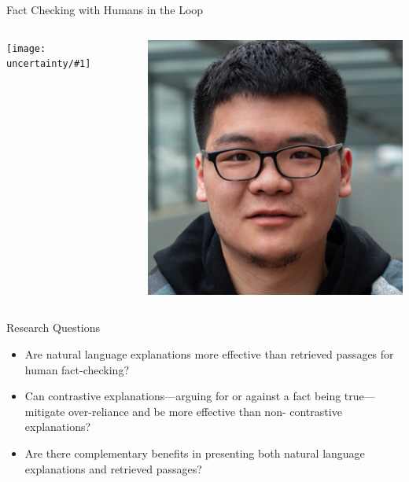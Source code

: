 \documentclass[compress]{beamer}
\newcommand{\gfxu}[2]{
	\begin{center}
		\texttt{[image: uncertainty/\#1]}
	\end{center}
}
\begin{document}
\begin{frame}{Fact Checking with Humans in the Loop}
	\begin{columns}

\gfxu{paper_convincingly}{.9}

\begin{center}
\includegraphics[width=1.0\linewidth]{general_figures/chenglei}		
	
\end{center}
	\end{columns}
\end{frame}

\begin{frame}{Research Questions}
	\begin{itemize}
		\item Are natural language explanations more effective than retrieved passages for human fact-checking?
		\item Can contrastive explanations—arguing for or against a fact being true—mitigate over-reliance and be more effective than non- contrastive explanations?
		\item  Are there complementary benefits in presenting both natural language explanations and retrieved passages?
	\end{itemize}
\end{frame}
  
\end{document}
